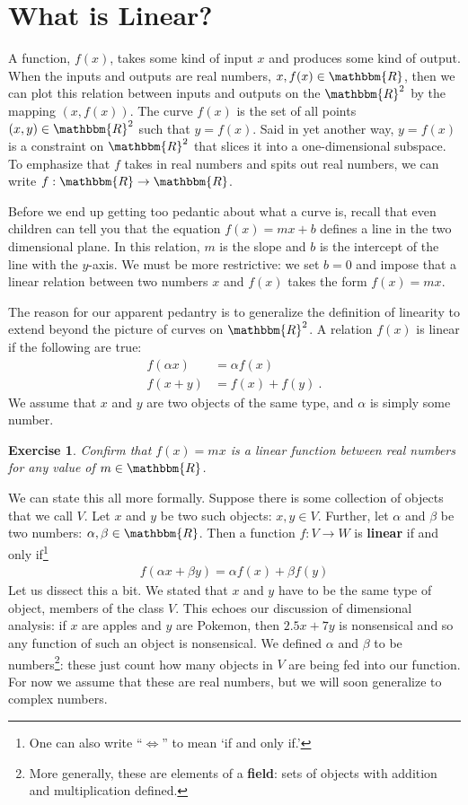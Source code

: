 \documentclass[
  11pt,
	colorful,
	raggedright,
]{tufte-style-thesis-flip}
\newtheorem{exercise}{Exercise}[section]
\begin{document}
\section{What is Linear?}

A function, $f(x)$, takes some kind of input $x$ and produces some kind of output. When the inputs and outputs are real numbers, $x,f(x)\in \mathbbm{R}$, then we can plot this relation between inputs and outputs on the $\mathbbm{R}^2$ by the mapping $(x,f(x))$. The curve $f(x)$ is the set of all points $(x,y) \in \mathbbm{R}^2$ such that $y=f(x)$. Said in yet another way, $y=f(x)$ is a constraint on $\mathbbm{R}^2$ that slices it into a one-dimensional subspace. To emphasize that $f$ takes in real numbers and spits out real numbers, we can write $f: \mathbbm{R}\to\mathbbm{R}$.

Before we end up getting too pedantic about what a curve is, recall that even children can tell you that the equation $f(x) = mx+b$ defines a line in the two dimensional plane. In this relation, $m$ is the slope and $b$ is the intercept of the line with the $y$-axis. We must be more restrictive: we set $b=0$ and impose that a linear relation between two numbers $x$ and $f(x)$ takes the form $f(x)=mx$. 

The reason for our apparent pedantry is to generalize the definition of {linearity} to extend beyond the picture of curves on $\mathbbm{R}^2$. A relation $f(x)$ is linear if the following are true:
\begin{align}
  f(\alpha x) &= \alpha f(x)\\
  f(x+y) &= f(x) + f(y) \ .
\end{align}
We assume that $x$ and $y$ are two objects of the same type, and $\alpha$ is simply some number.
\begin{exercise}
Confirm that $f(x)=mx$ is a linear function between real numbers for any value of $m\in \mathbbm{R}$.
\end{exercise}
We can state this all more formally. Suppose there is some collection of objects that we call $V$. Let $x$ and $y$ be two such objects: $x,y\in V$. Further, let $\alpha$ and $\beta$ be two numbers: $\alpha,\beta\in\mathbbm{R}$. Then a function $f:V\to W$ is \textbf{linear} if and only if\footnote{One can also write ``$\Leftrightarrow$'' to mean `if and only if.'}
\begin{align}
  f(\alpha x + \beta y) = \alpha f(x)+\beta f(y)
  \label{eq:def:linear}
\end{align}
Let us dissect this a bit. We stated that $x$ and $y$ have to be the same type of object, members of the class $V$. This echoes our discussion of dimensional analysis: if $x$ are apples and $y$ are Pokemon, then $2.5x+7y$ is nonsensical and so any function of such an object is nonsensical. We defined $\alpha$ and $\beta$ to be numbers\footnote{More generally, these are elements of a \textbf{field}: sets of objects with addition and multiplication defined.}: these just count how many objects in $V$ are being fed into our function. For now we assume that these are real numbers, but we will soon generalize to complex numbers. 
\end{document}

